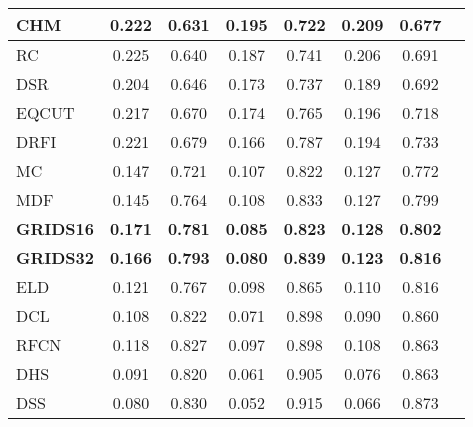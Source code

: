 \documentclass[a4paper,conference]{IEEEtran}
\begin{document}
\begin{table}
\begin{tabular}{|p{1cm}|c|c|c|c|c|c|c|}
    CHM & 0.222 & 0.631 & 0.195 & 0.722 & 0.209 & 0.677  \\ \hline
    RC & 0.225 & 0.640 & 0.187 & 0.741 & 0.206 & 0.691 \\ \hline
    DSR & 0.204 & 0.646 & 0.173 & 0.737 & 0.189 & 0.692  \\ \hline
    EQCUT & 0.217 & 0.670 & 0.174 & 0.765 & 0.196 & 0.718  \\ \hline
    DRFI & 0.221 & 0.679 & 0.166 & 0.787 & 0.194 & 0.733 \\ \hline
    MC & 0.147 & 0.721 & 0.107 & 0.822 & 0.127 & 0.772  \\ \hline
    MDF & 0.145 & 0.764 & 0.108 & 0.833 & 0.127 & 0.799   \\ \hline
    \textbf{GRIDS16} & \textbf{0.171} & \textbf{0.781} & \textbf{0.085} & \textbf{0.823} & \textbf{0.128} & \textbf{0.802} \\ \hline
        \textbf{GRIDS32} & \textbf{0.166} & \textbf{0.793} & \textbf{0.080} & \textbf{0.839} & \textbf{0.123} & \textbf{0.816} \\ \hline    ELD & 0.121 & 0.767 & 0.098 & 0.865 & 0.110 & 0.816  \\ \hline
    DCL & 0.108 & 0.822 & 0.071 & 0.898 & 0.090 & 0.860 \\ \hline
    RFCN & 0.118 & 0.827 & 0.097 & 0.898 & 0.108 & 0.863  \\ \hline
    DHS & 0.091 & 0.820 & 0.061 & 0.905 & 0.076 & 0.863  \\ \hline
    DSS & 0.080 & 0.830 & 0.052 & 0.915 & 0.066 & 0.873  \\ \hline
  \end{tabular}
  \label{table1}

\end{table}
\end{document}
